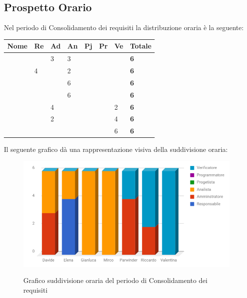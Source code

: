 \documentclass[PianoDiProgetto.tex]{subfiles}
\begin{document}
\subsection{Prospetto Orario}
Nel periodo di Consolidamento dei requisiti la distribuzione oraria è la
seguente:
\begin{center}

\begin{table}[htbp]
	\centering
	\renewcommand\arraystretch{1.5}
	\begin{tabularx}{\textwidth}{p{4cm}|p{1cm}|p{1cm}|p{1cm}|p{1cm}|p{1cm}|p{1cm}|p{2cm}}
		\hline
		\textbf{Nome} & \textbf{Re} & \textbf{Ad} & \textbf{An} & \textbf{Pj} & \textbf{Pr} & \textbf{Ve} & \textbf{Totale} \\
		\hline
		\Davide & \ & 3 & 3 & \ & \ & \ & \textbf{6} \\
		\hline
		\Elena & 4 & \ & 2 & \ & \ & \ & \textbf{6} \\
		\hline
		\Gianluca & \ & \ & 6 & \ & \ & \ & \textbf{6} \\
		\hline
		\Mirco & \ & \ & 6 & \ & \ & \ & \textbf{6} \\
		\hline
		\Parwinder & \ & 4 & \ & \ & \ & 2 & \textbf{6} \\
		\hline
		\Riccardo & \ & 2 & \ & \ & \ & 4 & \textbf{6} \\
		\hline
		\Valentina & \ & \ & \ & \ & \ & 6 & \textbf{6} \\
		\hline
	\end{tabularx}
\end{table}
\end{center}

Il seguente grafico dà una rappresentazione visiva della suddivisione oraria:

\begin{figure}[h]
	\includegraphics[width=14.5cm]{images/prospettoOrario/consolidamento.png}
	\label{fig:foo}
	\caption{Grafico suddivisione oraria del periodo di Consolidamento dei requisiti}
\end{figure} 
\clearpage
\end{document}
